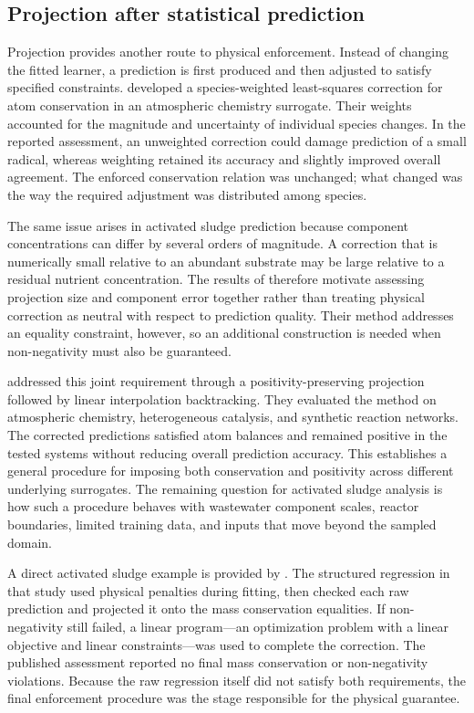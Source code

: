 \subsection{Projection after statistical prediction}

Projection provides another route to physical enforcement. Instead of changing the fitted learner, a prediction is first produced and then adjusted to satisfy specified constraints. \citet{SturmSilva2024} developed a species-weighted least-squares correction for atom conservation in an atmospheric chemistry surrogate. Their weights accounted for the magnitude and uncertainty of individual species changes. In the reported assessment, an unweighted correction could damage prediction of a small radical, whereas weighting retained its accuracy and slightly improved overall agreement. The enforced conservation relation was unchanged; what changed was the way the required adjustment was distributed among species.

The same issue arises in activated sludge prediction because component concentrations can differ by several orders of magnitude. A correction that is numerically small relative to an abundant substrate may be large relative to a residual nutrient concentration. The results of \citet{SturmSilva2024} therefore motivate assessing projection size and component error together rather than treating physical correction as neutral with respect to prediction quality. Their method addresses an equality constraint, however, so an additional construction is needed when non-negativity must also be guaranteed.

\citet{KircherVotsmeier2025} addressed this joint requirement through a positivity-preserving projection followed by linear interpolation backtracking. They evaluated the method on atmospheric chemistry, heterogeneous catalysis, and synthetic reaction networks. The corrected predictions satisfied atom balances and remained positive in the tested systems without reducing overall prediction accuracy. This establishes a general procedure for imposing both conservation and positivity across different underlying surrogates. The remaining question for activated sludge analysis is how such a procedure behaves with wastewater component scales, reactor boundaries, limited training data, and inputs that move beyond the sampled domain.

A direct activated sludge example is provided by \citet{Selerio2026}. The structured regression in that study used physical penalties during fitting, then checked each raw prediction and projected it onto the mass conservation equalities. If non-negativity still failed, a linear program---an optimization problem with a linear objective and linear constraints---was used to complete the correction. The published assessment reported no final mass conservation or non-negativity violations. Because the raw regression itself did not satisfy both requirements, the final enforcement procedure was the stage responsible for the physical guarantee.

